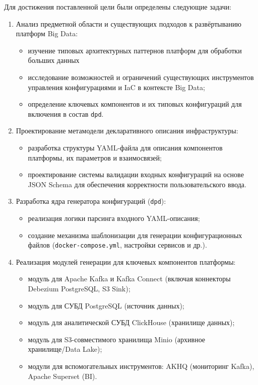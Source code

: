Для достижения поставленной цели были определены следующие задачи:

\begin{enumerate}[1.]
    \item Анализ предметной области и существующих подходов к развёртыванию платформ Big Data:
          \begin{itemize}
              \item изучение типовых архитектурных паттернов платформ для обработки больших данных\cite{narkhede_kafka}
              \item исследование возможностей и ограничений существующих инструментов управления конфигурациями и IaC в контексте Big Data;
              \item определение ключевых компонентов и их типовых конфигураций для включения в состав \texttt{dpd}.
          \end{itemize}

    \item Проектирование метамодели декларативного описания инфраструктуры:
          \begin{itemize}
              \item разработка структуры YAML-файла для описания компонентов платформы, их параметров и взаимосвязей;
              \item проектирование системы валидации входных конфигураций на основе JSON Schema\cite{json_schema} для обеспечения корректности пользовательского ввода.
          \end{itemize}

    \item Разработка ядра генератора конфигураций (\texttt{dpd}):
          \begin{itemize}
              \item реализация логики парсинга входного YAML-описания;
              \item создание механизма шаблонизации для генерации конфигурационных файлов (\texttt{docker-compose.yml}, настройки сервисов и др.).
          \end{itemize}

    \item Реализация модулей генерации для ключевых компонентов платформы:
          \begin{itemize}
              \item модуль для Apache Kafka и Kafka Connect (включая коннекторы Debezium PostgreSQL, S3 Sink);
              \item модуль для СУБД PostgreSQL (источник данных);
              \item модуль для аналитической СУБД ClickHouse (хранилище данных);
              \item модуль для S3-совместимого хранилища Minio (архивное хранилище/Data Lake);
              \item модули для вспомогательных инструментов: AKHQ (мониторинг Kafka), Apache Superset (BI).
          \end{itemize}


\end{enumerate}

